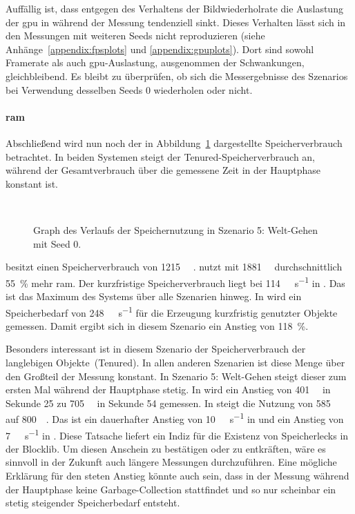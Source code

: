 Auffällig ist, dass entgegen des Verhaltens der Bildwiederholrate die Auslastung der \ac{gpu} in \sysB{} während der Messung tendenziell sinkt. Dieses Verhalten lässt sich in den Messungen mit weiteren Seeds nicht reproduzieren (siehe Anhänge~\vref{appendix:fpsplots} und \vref{appendix:gpuplots}). Dort sind sowohl Framerate als auch \ac{gpu}-Auslastung, ausgenommen der Schwankungen, gleichbleibend. Es bleibt zu überprüfen, ob sich die Messergebnisse des Szenarios bei Verwendung desselben Seeds $0$ wiederholen oder nicht.

\paragraph{\ac{ram}}
Abschließend wird nun noch der in Abbildung~\ref{fig:seed-0-walk-mem} dargestellte Speicherverbrauch betrachtet. In beiden Systemen steigt der Tenured-Speicherverbrauch an, während der Gesamtverbrauch über die gemessene Zeit in der Hauptphase konstant ist.
\begin{figure}[!htbp]
	\\
	\caption{Graph des Verlaufs der Speichernutzung in Szenario 5: Welt-Gehen mit Seed 0.}\label{fig:seed-0-walk-mem}
\end{figure} 
\sysA{} besitzt einen Speicherverbrauch von \SI{1215}{\mega\byte} .\sysB{} nutzt mit \SI{1881}{\mega\byte} durchschnittlich \SI{55}{\percent} mehr \ac{ram}. Der kurzfristige Speicherverbrauch liegt bei \SI{114}{\mega\byte\per\second} in \sysA{}. Das ist das Maximum des Systems über alle Szenarien hinweg. In \sysB{} wird ein Speicherbedarf von \SI{248}{\mega\byte\per\second} für die Erzeugung kurzfristig genutzter Objekte gemessen. Damit ergibt sich in diesem Szenario ein Anstieg von \SI{118}{\percent}. 

Besonders interessant ist in diesem Szenario der Speicherverbrauch der langlebigen Objekte~(Tenured). In allen anderen Szenarien ist diese Menge über den Großteil der Messung konstant.
In Szenario 5: Welt-Gehen steigt dieser zum ersten Mal während der Hauptphase stetig. In \sysA{} wird ein Anstieg von \SI{401}{\mega\byte} in Sekunde 25 zu \SI{705}{\mega\byte} in Sekunde 54 gemessen. In \sysB{} steigt die Nutzung von \SI{585}{\mega\byte} auf \SI{800}{\mega\byte}. Das ist ein dauerhafter Anstieg von \SI{10}{\mega\byte\per\second} in \sysA{} und ein Anstieg von \SI{7}{\mega\byte\per\second} in \sysB{}. Diese Tatsache liefert ein Indiz für die Existenz von Speicherlecks in der Blocklib. Um diesen Anschein zu bestätigen oder zu entkräften, wäre es sinnvoll in der Zukunft auch längere Messungen durchzuführen. Eine mögliche Erklärung für den steten Anstieg könnte auch sein, dass in der Messung während der Hauptphase keine Garbage-Collection stattfindet und so nur scheinbar ein stetig steigender Speicherbedarf entsteht.

